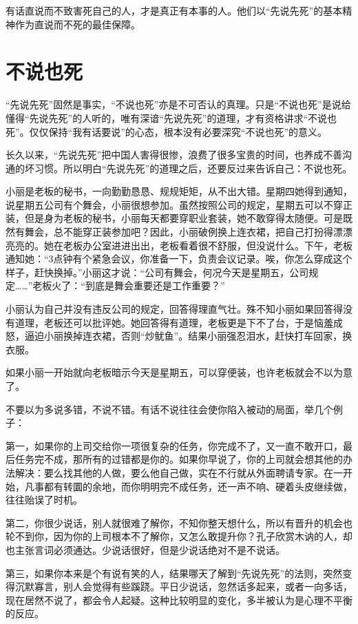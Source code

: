 \documentclass[fontset=fandol, a4paper, 12pt, openright]{ctexbook}
\begin{document}
有话直说而不致害死自己的人，才是真正有本事的人。他们以“先说先死”的基本精神作为直说而不死的最佳保障。


\section{不说也死}

“先说先死”固然是事实，“不说也死”亦是不可否认的真理。只是“不说也死”是说给懂得“先说先死”的人听的，唯有深谙“先说先死”的道理，才有资格讲求“不说也死”。仅仅保持“我有话要说”的心态，根本没有必要深究“不说也死”的意义。

长久以来，“先说先死”把中国人害得很惨，浪费了很多宝贵的时间，也养成不善沟通的坏习惯。所以明白“先说先死”的道理之后，还要反过来告诉自己：不说也死。

小丽是老板的秘书，一向勤勤恳恳、规规矩矩，从不出大错。星期四她得到通知，说星期五公司有个舞会，小丽很想参加。虽然按照公司的规定，星期五可以不穿正装，但是身为老板的秘书，小丽每天都要穿职业套装，她不敢穿得太随便。可是既然有舞会，总不能穿正装参加吧？因此，小丽破例换上连衣裙，把自己打扮得漂漂亮亮的。她在老板办公室进进出出，老板看着很不舒服，但没说什么。下午，老板通知她：“3点钟有个紧急会议，你准备一下，负责会议记录。唉，你怎么穿成这个样子，赶快换掉。”小丽这才说：“公司有舞会，何况今天是星期五，公司规定……”老板火了：“到底是舞会重要还是工作重要？”

小丽认为自己并没有违反公司的规定，回答得理直气壮。殊不知小丽如果回答得没有道理，老板还可以批评她。她回答得有道理，老板更是下不了台，于是恼羞成怒，逼迫小丽换掉连衣裙，否则“炒鱿鱼”。结果小丽强忍泪水，赶快打车回家，换衣服。

如果小丽一开始就向老板暗示今天是星期五，可以穿便装，也许老板就会不以为意了。

不要以为多说多错，不说不错。有话不说往往会使你陷入被动的局面，举几个例子：

第一，如果你的上司交给你一项很复杂的任务，你完成不了，又一直不敢开口，最后任务完不成，那所有的过错都是你的。如果你早说了，你的上司就会想其他的办法解决：要么找其他的人做，要么他自己做，实在不行就从外面聘请专家。在一开始，凡事都有转圜的余地，而你明明完不成任务，还一声不响、硬着头皮继续做，往往贻误了时机。

第二，你很少说话，别人就很难了解你，不知你整天想什么，所以有晋升的机会也轮不到你，因为你的上司根本不了解你，又怎么敢提升你？孔子欣赏木讷的人，却也主张言词必须通达。少说话很好，但是少说话绝对不是不说话。

第三，如果你本来是个有说有笑的人，结果哪天了解到“先说先死”的法则，突然变得沉默寡言，别人会觉得有些蹊跷。平日少说话，忽然话多起来，或者一向多话，现在居然不说了，都会令人起疑。这种比较明显的变化，多半被认为是心理不平衡的反应。
\end{document}
